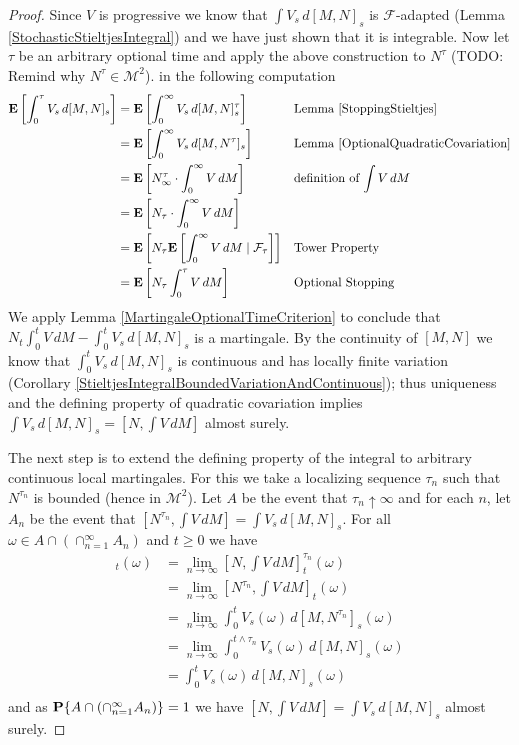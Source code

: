 \begin{proof}
Since $V$ is progressive we know that $\int V_s \, d[M,N]_s$ is $\mathcal{F}$-adapted (Lemma \ref{StochasticStieltjesIntegral}) and we have just shown that it is integrable.  Now let $\tau$ be an arbitrary optional time and apply the above construction to $N^\tau$ (TODO: Remind why $N^\tau \in \mathcal{M}^2$).  in the following computation
\begin{align*}
\expectation{\int_0^\tau V_s \, d[M,N]_s}  &=\expectation{ \int_0^\infty V_s \, d[M,N]^\tau_s} && \text{Lemma \ref{StoppingStieltjes}}\\
&=\expectation{ \int_0^\infty V_s \, d[M,N ^\tau]_s} && \text{Lemma \ref{OptionalQuadraticCovariation}}\\
&=\expectation{ N^\tau_\infty \cdot \int_0^\infty V \, dM} && \text{definition of $\int V \, dM$}\\
&=\expectation{ N_\tau \cdot \int_0^\infty V \, dM} \\
&=\expectation{ N_\tau \cexpectationlong{\mathcal{F}_\tau}{ \int_0^\infty V \, dM} } && \text{Tower Property}\\
&=\expectation{ N_\tau \int_0^\tau V \, dM}  && \text{Optional Stopping}\\
\end{align*}
We apply Lemma \ref{MartingaleOptionalTimeCriterion} to conclude that $N_t \int_0^t V \, dM - \int_0^t V_s \, d[M,N]_s$ is a martingale.  By the continuity of $[M,N]$ we know that $\int_0^t V_s \, d[M,N]_s$ is continuous and has locally finite variation (Corollary \ref{StieltjesIntegralBoundedVariationAndContinuous}); thus uniqueness and the defining property of quadratic covariation implies $\int V_s \, d[M,N]_s = [N, \int V \, dM]$ almost surely.

The next step is to extend the defining property of the integral to arbitrary continuous local martingales.  For this we take a localizing sequence $\tau_n$ such that $N^{\tau_n}$ is bounded (hence in $\mathcal{M}^2$).  Let $A$ be the event that $\tau_n \uparrow \infty$ and for each $n$, let $A_n$ be the event that $[N^{\tau_n}, \int V \, dM] = \int V_s \, d[M,N]_s$.  For all  $\omega \in A \cap \left(\cap_{n=1}^\infty A_n \right)$ and $t \geq 0$ we have 
\begin{align*}
[N, \int V \, dM]_t(\omega) &= \lim_{n \to \infty} [N, \int V \, dM]^{\tau_n}_t(\omega) \\
&= \lim_{n \to \infty} [N ^{\tau_n}, \int V \, dM]_t(\omega) \\
&= \lim_{n \to \infty} \int_0^t V_s(\omega) \, d[M,N^{\tau_n}]_s(\omega) \\
&= \lim_{n \to \infty} \int_0^{t \wedge \tau_n} V_s(\omega) \, d[M,N]_s(\omega) \\
&= \int_0^{t} V_s(\omega) \, d[M,N]_s(\omega) \\
\end{align*}
and as $\probability{A \cap \left(\cap_{n=1}^\infty A_n \right)} = 1$ we have $[N, \int V \, dM] = \int V_s \, d[M,N]_s$ almost surely.


\end{proof}
